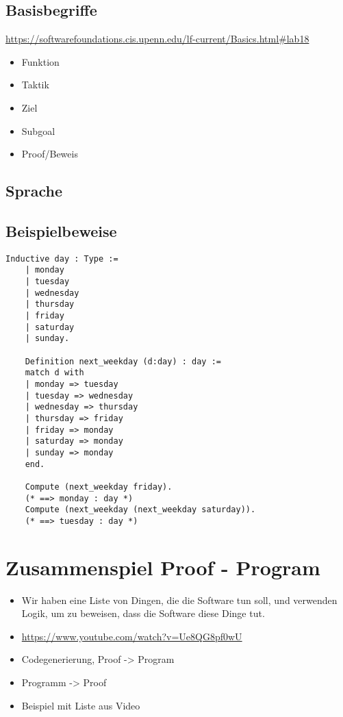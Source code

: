 \subsection{Basisbegriffe}
\url{https://softwarefoundations.cis.upenn.edu/lf-current/Basics.html#lab18}
\begin{itemize}
	\item Funktion
	\item Taktik
	\item Ziel
	\item Subgoal
	\item Proof/Beweis
\end{itemize}
\subsection{Sprache}
\subsection{Beispielbeweise}

\begin{lstlisting}[language=coq,firstnumber=1,caption=Coq Beispiel,label=lst:api-config]
	Inductive day : Type :=
	| monday
	| tuesday
	| wednesday
	| thursday
	| friday
	| saturday
	| sunday.

	Definition next_weekday (d:day) : day :=
	match d with
	| monday => tuesday
	| tuesday => wednesday
	| wednesday => thursday
	| thursday => friday
	| friday => monday
	| saturday => monday
	| sunday => monday
	end.

	Compute (next_weekday friday).
	(* ==> monday : day *)
	Compute (next_weekday (next_weekday saturday)).
	(* ==> tuesday : day *)
\end{lstlisting}

\section{Zusammenspiel Proof - Program}
\begin{itemize}
	\item Wir haben eine Liste von Dingen, die die Software tun soll, und verwenden Logik, um zu beweisen, dass die Software diese Dinge tut.
	\item \url{https://www.youtube.com/watch?v=Ue8QG8pf0wU}
	\item Codegenerierung, Proof -> Program
	\item Programm -> Proof
	\item Beispiel mit Liste aus Video
\end{itemize}

